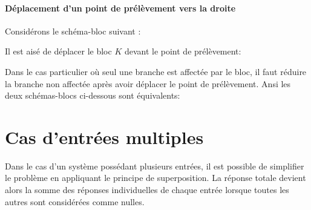 \paragraph{Déplacement d'un point de prélèvement vers la droite}
Considérons le schéma-bloc suivant :
\begin{center}
    
\end{center}
Il est aisé de déplacer le bloc $K$ devant le point de prélèvement:  
\begin{center}
    
\end{center}
Dans le cas particulier où seul une branche est affectée par le bloc, 
il faut réduire la branche non affectée après avoir déplacer le point 
de prélèvement. Ansi les deux schémas-blocs ci-dessous sont équivalents:
\begin{center}
    
\end{center}
\newpage
\section{Cas d'entrées multiples\label{sec-bloc_multE}}
Dans le cas d'un système possédant plusieurs entrées, il est possible 
de simplifier le problème en appliquant le principe de superposition. La réponse
totale devient alors la somme des réponses individuelles de chaque entrée 
lorsque toutes les autres sont considérées comme nulles.


